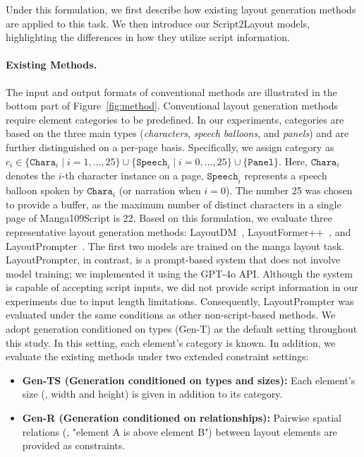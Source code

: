 Under this formulation, we first describe how existing layout generation methods are applied to this task. We then introduce our Script2Layout models, highlighting the differences in how they utilize script information.

\vspace{-0.8em}
\paragraph{Existing Methods.}
The input and output formats of conventional methods are illustrated in the bottom part of Figure~\ref{fig:method}. Conventional layout generation methods require element categories to be predefined. In our experiments, categories are based on the three main types (\textit{characters}, \textit{speech balloons}, and \textit{panels}) and are further distinguished on a per-page basis. Specifically, we assign category as $c_i \in \{\texttt{Chara}_i \mid i=1,\dots,25\} \cup \{\texttt{Speech}_i \mid i=0,\dots,25\} \cup \{\texttt{Panel}\}$. Here, $\texttt{Chara}_i$ denotes the $i$-th character instance on a page, $\texttt{Speech}_i$ represents a speech balloon spoken by $\texttt{Chara}_i$ (or narration when $i = 0$). The number 25 was chosen to provide a buffer, as the maximum number of distinct characters in a single page of Manga109Script is 22. Based on this formulation, we evaluate three representative layout generation methods: LayoutDM~\cite{inoue2023layoutdm}, LayoutFormer++~\cite{jiang_layoutformer_2023}, and LayoutPrompter~\cite{lin_layoutprompter_2023}. The first two models are trained on the manga layout task. LayoutPrompter, in contrast, is a prompt-based system that does not involve model training; we implemented it using the GPT-4o API. Although the system is capable of accepting script inputs, we did not provide script information in our experiments due to input length limitations. Consequently, LayoutPrompter was evaluated under the same conditions as other non-script-based methods. We adopt generation conditioned on types (Gen-T) as the default setting throughout this study. In this setting, each element's category is known. In addition, we evaluate the existing methods under two extended constraint settings: 

\begin{itemize}
  \item \textbf{Gen-TS (Generation conditioned on types and sizes):} Each element's size (\ie, width and height) is given in addition to its category.
  \item \textbf{Gen-R (Generation conditioned on relationships):} Pairwise spatial relations (\eg, "element A is above element B") between layout elements are provided as constraints.
\end{itemize}


